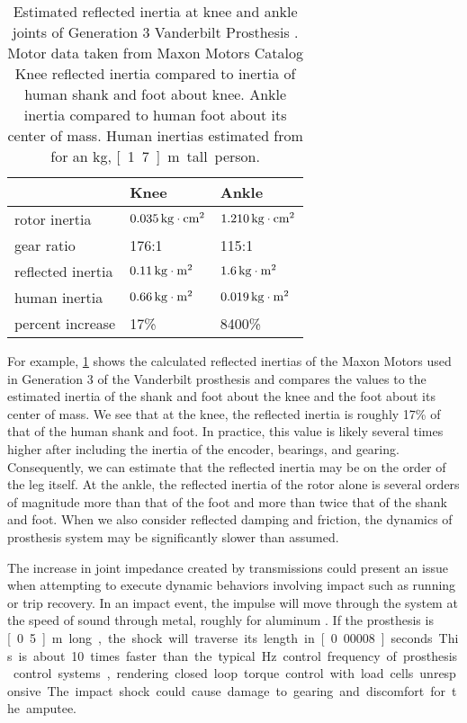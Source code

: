 \begin{table}
  \centering
  \begin{tabular}{lll}
    \toprule
    & Knee & Ankle \\
    \midrule
    rotor inertia & $\unit[0.035]{kg \cdot cm^2}$ 
        & $\unit[1.210]{kg \cdot cm^2}$\\
    gear ratio & 176:1 & 115:1 \\
    reflected inertia & $\unit[0.11]{kg \cdot m^2}$ & 
        $\unit[1.6]{kg \cdot m^2}$\\
    human inertia & $\unit[0.66]{kg \cdot m^2}$  & $\unit[0.019]{kg \cdot m^2}$\\
    percent increase & 17\% & 8400\% \\
    \bottomrule
  \end{tabular}
  \caption{Estimated reflected inertia at knee and ankle joints of Generation 3
  Vanderbilt Prosthesis \citep{lawson2014robotic}. Motor data taken from Maxon
  Motors Catalog\citep{maxon_flat_motor,
  maxon_ec4pole} Knee reflected inertia compared to inertia of human shank and
  foot about knee. Ankle inertia compared to human foot about its center of
  mass. Human inertias estimated from \citet{winter2009biomechanics} for an
  \unit[85]{kg}, \unit[1.7]{m} tall person.}
  \label{tab:vanderbilt_reflec_interita}
\end{table}

For example, \cref{tab:vanderbilt_reflec_interita} shows the calculated
reflected inertias of the Maxon Motors used in Generation 3 of the Vanderbilt
prosthesis and compares the values to the estimated inertia of the shank and
foot about the knee and the foot about its center of mass. We see that at the
knee, the reflected inertia is roughly 17\% of that of the human shank and foot.
In practice, this value is likely several times higher after including the
inertia of the encoder, bearings, and gearing. Consequently, we can estimate
that the reflected inertia may be on the order of the leg itself. At the ankle,
the reflected inertia of the rotor alone is several orders of magnitude more
than that of the foot and more than twice that of the shank and foot. When we
also consider reflected damping and friction, the dynamics of prosthesis system
may be significantly slower than assumed.

The increase in joint impedance created by transmissions could present an issue
when attempting to execute dynamic behaviors involving impact such as running or
trip recovery. In an impact event, the impulse will move through the system at
the speed of sound through metal, roughly  for aluminum
\citep{lide2004crc}. If the prosthesis is \unit[0.5]{m} long, the shock will
traverse its length in \unit[0.00008]{seconds}. This is about 10 times faster
than the typical \unit[1000]{Hz} control frequency of prosthesis control
systems, rendering closed loop torque control with load cells unresponsive. The
impact shock could cause damage to gearing and discomfort for the amputee.

